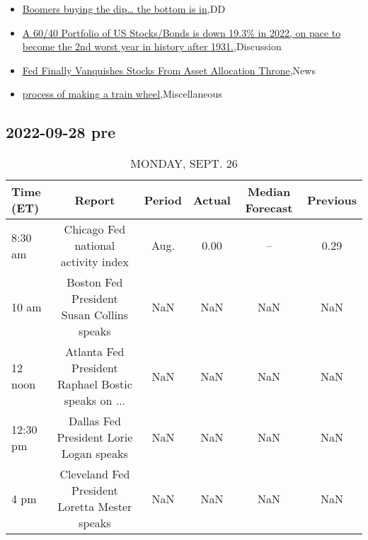 \documentclass{book}
\begin{document}
  \begin{itemize}%
  \item%
  \href{https://reddit.com/r/wallstreetbets/comments/xn132c/boomers\_buying\_the\_dip\_the\_bottom\_is\_in/}{Boomers buying the dip… the bottom is in},DD%
  \item%
  \href{https://reddit.com/r/StockMarket/comments/xmum61/a\_6040\_portfolio\_of\_us\_stocksbonds\_is\_down\_193\_in/}{A 60/40 Portfolio of US Stocks/Bonds is down 19.3\% in 2022, on pace to become the 2nd worst year in history after 1931.},Discussion%
  \item%
  \href{https://reddit.com/r/Economics/comments/xmxqqp/fed\_finally\_vanquishes\_stocks\_from\_asset/}{Fed Finally Vanquishes Stocks From Asset Allocation Throne},News%
  \item%
  \href{https://reddit.com/r/railroading/comments/xmw2sp/process\_of\_making\_a\_train\_wheel/}{process of making a train wheel},Miscellaneous%
  \end{itemize}%
  
  

  
  \subsection{ 2022-09-28 pre }
  \normalsize%
  
  
  \begin{table}[htbp]%
  \caption{MONDAY, SEPT. 26}%
  \centering%
  \begin{adjustbox}{width=1\textwidth}%
  \begin{tabular}{lccccc}
  \toprule
  Time (ET) &                                             Report & Period & Actual & Median Forecast & Previous \\
  \midrule
    8:30 am &                Chicago Fed national activity index &   Aug. &   0.00 &              -- &     0.29 \\
      10 am &          Boston Fed President Susan Collins speaks &    NaN &    NaN &             NaN &      NaN \\
    12 noon & Atlanta Fed President Raphael Bostic speaks on ... &    NaN &    NaN &             NaN &      NaN \\
   12:30 pm &            Dallas Fed President Lorie Logan speaks &    NaN &    NaN &             NaN &      NaN \\
       4 pm &      Cleveland Fed President Loretta Mester speaks &    NaN &    NaN &             NaN &      NaN \\
  \bottomrule
  \end{tabular}
  \end{adjustbox}%
  \end{table}
  
\end{document}
